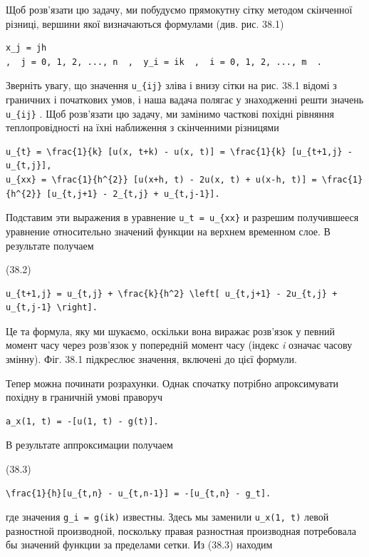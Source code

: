 \documentclass[
  ukrainian,
]{article}
\begin{document}
Щоб розв'язати цю задачу, ми побудуємо прямокутну сітку методом
скінченної різниці, вершини якої визначаються формулами (див. рис. 38.1)

\begin{verbatim}
x_j = jh
,  j = 0, 1, 2, ..., n  ,  y_i = ik  ,  i = 0, 1, 2, ..., m  .
\end{verbatim}

Зверніть увагу, що значення \texttt{u\_\{ij\}} зліва і внизу сітки на
рис. 38.1 відомі з граничних і початкових умов, і наша вадача полягає у
знаходженні решти значень \texttt{u\_\{ij\}} . Щоб розв'язати цю задачу,
ми замінимо часткові похідні рівняння теплопровідності на їхні
наближення з скінченними різницями

\begin{verbatim}
u_{t} = \frac{1}{k} [u(x, t+k) - u(x, t)] = \frac{1}{k} [u_{t+1,j} - u_{t,j}],
u_{xx} = \frac{1}{h^{2}} [u(x+h, t) - 2u(x, t) + u(x-h, t)] = \frac{1}{h^{2}} [u_{t,j+1} - 2_{t,j} + u_{t,j-1}].
\end{verbatim}

Подставим эти выражения в уравнение \texttt{u\_t\ =\ u\_\{xx\}} и
разрешим получившееся уравнение относительно значений функции на верхнем
временном слое. В результате получаем

(38.2)

\begin{verbatim}
u_{t+1,j} = u_{t,j} + \frac{k}{h^2} \left[ u_{t,j+1} - 2u_{t,j} + u_{t,j-1} \right].
\end{verbatim}

Це та формула, яку ми шукаємо, оскільки вона виражає розв'язок у певний
момент часу через розв'язок у попередній момент часу (індекс \emph{i}
означає часову змінну). Фіг. 38.1 підкреслює значення, включені до цієї
формули.

Тепер можна починати розрахунки. Однак спочатку потрібно апроксимувати
похідну в граничній умові праворуч

\begin{verbatim}
a_x(1, t) = -[u(1, t) - g(t)].
\end{verbatim}

В результате аппроксимации получаем

(38.3)

\begin{verbatim}
\frac{1}{h}[u_{t,n} - u_{t,n-1}] = -[u_{t,n} - g_t].
\end{verbatim}

где значения \texttt{g\_i\ =\ g(ik)} известны. Здесь мы заменили
\texttt{u\_x(1,\ t)} левой разностной производной, поскольку правая
разностная производная потребовала бы значений функции за пределами
сетки. Из (38.3) находим
\end{document}
